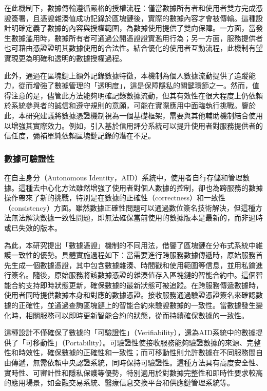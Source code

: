 在此機制下，數據傳輸遵循嚴格的授權流程：僅當數據所有者和使用者雙方完成憑證簽署，且憑證雜湊值成功記錄於區塊鏈後，實際的數據內容才會被傳輸。這種設計明確定義了數據的內容與授權範圍，為數據使用提供了雙向保障。一方面，當發生數據濫用時，數據所有者可通過公開憑證證實濫用行為；另一方面，服務提供者也可藉由憑證證明其數據使用的合法性。結合優化的使用者互動流程，此機制有望實現更為明確和透明的數據授權過程。

此外，通過在區塊鏈上額外記錄數據特徵，本機制為個人數據流動提供了追蹤能力，從而增強了數據管理的「透明度」，這是保障隱私的關鍵環節之一。然而，值得注意的是，儘管此方法能夠明確記錄數據流動，但其有效性在很大程度上仍依賴於系統參與者的誠信和遵守規則的意願，可能在實際應用中面臨執行挑戰。鑒於此，本研究建議將數據憑證機制視為一個基礎框架，需要與其他輔助機制結合使用以增強其實際效力。例如，引入基於信用評分系統可以提升使用者對服務提供者的信任度，彌補單純依賴區塊鏈記錄的潛在不足。
\subsubsection{數據可驗證性}
在自主身分（Autonomous Identity，AID）系統中，使用者自行存儲和管理數據。這種去中心化方法雖然增強了使用者對個人數據的控制，卻也為跨服務的數據操作帶來了新的挑戰，特別是在數據的正確性（correctness）和一致性（consistency）方面。雖然數據正確性問題可以通過數位簽名技術解決，但這種方法無法解決數據一致性問題，即無法確保當前使用的數據版本是最新的，而非過時或已失效的版本。

為此，本研究提出「數據憑證」機制的不同用法，借鑒了區塊鏈在分布式系統中維護一致性的優勢。具體實施過程如下：當需要進行跨服務數據傳遞時，原始服務首先生成一個數據憑證，其中包含數據雜湊、時間戳和使用範圍等信息，並用私鑰進行簽名。隨後，原始服務將該數據憑證的雜湊值存入區塊鏈的智能合約中。這個智能合約支持即時狀態更新，確保數據的最新狀態可被追蹤。在跨服務傳遞數據時，使用者同時提供數據本身和對應的數據憑證。接收服務通過驗證憑證簽名來確認數據的正確性，並通過查詢區塊鏈上的智能合約來驗證數據的一致性。當數據發生變化時，相關服務可以即時更新智能合約的狀態，從而持續確保數據的一致性。

這種設計不僅確保了數據的「可驗證性」（Verifiability），還為AID系統中的數據提供了「可移動性」（Portability）。可驗證性使接收服務能夠驗證數據的來源、完整性和時效性，確保數據的正確性和一致性；而可移動性則允許數據在不同服務間自由傳遞，無需依賴中央認證系統，同時保持可驗證性。這種方法具有高度安全性、實時性、可審計性和隱私保護等優勢，特別適用於對數據完整性和即時性要求較高的應用場景，如金融交易系統、醫療信息交換平台和供應鏈管理系統等。


